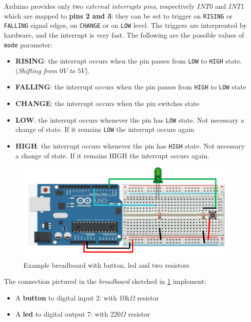 \documentclass[10pt,a4paper]{report}
\theoremstyle{definition}
\begin{document}
Arduino provides only two \textit{external interrupts pins}, respectively $INT0$ and $INT1$ which are mapped to \textbf{pins 2 and 3}: they can be set to trigger on \texttt{RISING} or \texttt{FALLING} signal edges, on \texttt{CHANGE} or on \texttt{LOW} level. The triggers are interprented by hardware, and the interrupt is very fast. The following are the possible values of \texttt{mode} parameter:
\begin{itemize}
	\item 
	\textbf{RISING}: the interrupt occurs when the pin passes from \texttt{LOW} to \texttt{HIGH} state. (\textit{Shifting from $0V$ to $5V$}).
	\item 
	\textbf{FALLING}: the interrupt occurs when the pin passes from \texttt{HIGH} to \texttt{LOW} state
	\item 
	\textbf{CHANGE}: the interrupt occurs when the pin switches state
	\item 
	\textbf{LOW}: the interrupt occurs whenever the pin has \texttt{LOW} state. Not necessary a change of state. If it remains \texttt{LOW} the interrupt occurs again
	\item 
	\textbf{HIGH}: the interrupt occurs whenever the pin has \texttt{HIGH} state. Not necessary a change of state. If it remains HIGH the interrupt occurs again.

\end{itemize}
	\begin{figure}[h]
	\centering\includegraphics[scale=0.50]{images/Pasted image 20230418153709.png}
	\caption{Example breadboard with button, led and two resistors}
	\label{arduino-breadboard1}
\end{figure}

The connection pictured in the \textit{breadboard} sketched in \ref{arduino-breadboard1} implement:
\begin{itemize}
	\item 
	A \textbf{button} to digital input 2: with 10k$\Omega$ resistor
	\item 
	A \textbf{led} to digital output 7: with 220$\Omega$ resistor
\end{itemize}
\end{document}
